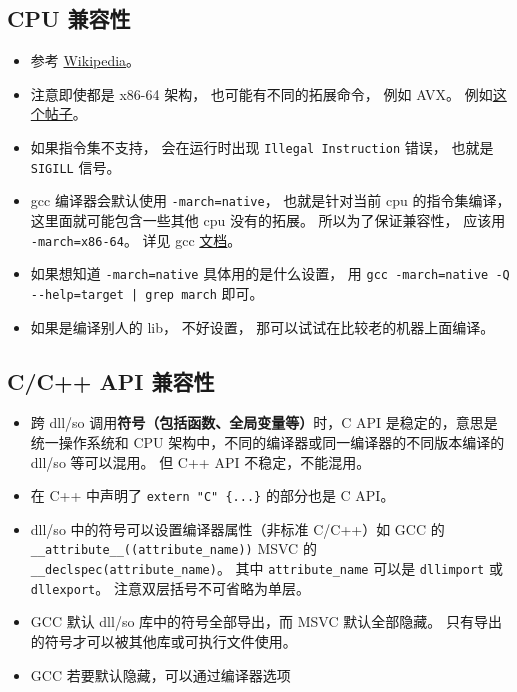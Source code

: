 
\begin{issues}
\issueDraft
\end{issues}


\subsection{CPU 兼容性}

\begin{itemize}
\item 参考 \href{https://en.wikipedia.org/wiki/Binary-code_compatibility}{Wikipedia}。
\item 注意即使都是 x86-64 架构， 也可能有不同的拓展命令， 例如 AVX。 例如\href{https://stackoverflow.com/questions/50945287/illegal-instruction-when-run-precompiled-program-on-other-machine}{这个帖子}。
\item 如果指令集不支持， 会在运行时出现 \verb`Illegal Instruction` 错误， 也就是 \verb`SIGILL` 信号。
\item gcc 编译器会默认使用 \verb`-march=native`， 也就是针对当前 cpu 的指令集编译， 这里面就可能包含一些其他 cpu 没有的拓展。 所以为了保证兼容性， 应该用 \verb`-march=x86-64`。 详见 gcc \href{https://gcc.gnu.org/onlinedocs/gcc/x86-Options.html}{文档}。
\item 如果想知道 \verb`-march=native` 具体用的是什么设置， 用 \verb`gcc -march=native -Q --help=target | grep march` 即可。
\item 如果是编译别人的 lib， 不好设置， 那可以试试在比较老的机器上面编译。
\end{itemize}

\subsection{C/C++ API 兼容性}
\begin{itemize}
\item 跨 dll/so 调用\textbf{符号（包括函数、全局变量等）}时，C API 是稳定的，意思是统一操作系统和 CPU 架构中，不同的编译器或同一编译器的不同版本编译的 dll/so 等可以混用。 但 C++ API 不稳定，不能混用。
\item 在 C++ 中声明了 \verb`extern "C" {...}` 的部分也是 C API。
\item dll/so 中的符号可以设置编译器属性（非标准 C/C++）如 GCC 的 \verb`__attribute__((attribute_name))` MSVC 的 \verb`__declspec(attribute_name)`。 其中 \verb`attribute_name` 可以是 \verb`dllimport` 或 \verb`dllexport`。 注意双层括号不可省略为单层。
\item GCC 默认 dll/so 库中的符号全部导出，而 MSVC 默认全部隐藏。 只有导出的符号才可以被其他库或可执行文件使用。
\item GCC 若要默认隐藏，可以通过编译器选项
\end{itemize}

